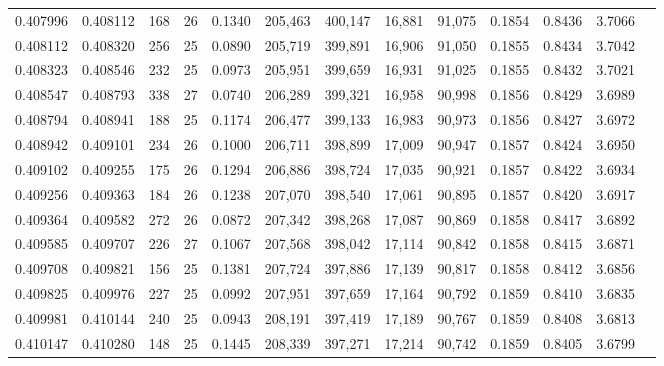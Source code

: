 \begin{tabular}{rrrrrrrrrrrrr}
0.407996 & 0.408112 & 168 &  26 &                                     0.1340 & 205,463 & 400,147 &  16,881 &  91,075 & 0.1854 & 0.8436 & 3.7066 \\
0.408112 & 0.408320 & 256 &  25 &                                     0.0890 & 205,719 & 399,891 &  16,906 &  91,050 & 0.1855 & 0.8434 & 3.7042 \\
0.408323 & 0.408546 & 232 &  25 &                                     0.0973 & 205,951 & 399,659 &  16,931 &  91,025 & 0.1855 & 0.8432 & 3.7021 \\
0.408547 & 0.408793 & 338 &  27 &                                     0.0740 & 206,289 & 399,321 &  16,958 &  90,998 & 0.1856 & 0.8429 & 3.6989 \\
0.408794 & 0.408941 & 188 &  25 &                                     0.1174 & 206,477 & 399,133 &  16,983 &  90,973 & 0.1856 & 0.8427 & 3.6972 \\
0.408942 & 0.409101 & 234 &  26 &                                     0.1000 & 206,711 & 398,899 &  17,009 &  90,947 & 0.1857 & 0.8424 & 3.6950 \\
0.409102 & 0.409255 & 175 &  26 &                                     0.1294 & 206,886 & 398,724 &  17,035 &  90,921 & 0.1857 & 0.8422 & 3.6934 \\
0.409256 & 0.409363 & 184 &  26 &                                     0.1238 & 207,070 & 398,540 &  17,061 &  90,895 & 0.1857 & 0.8420 & 3.6917 \\
0.409364 & 0.409582 & 272 &  26 &                                     0.0872 & 207,342 & 398,268 &  17,087 &  90,869 & 0.1858 & 0.8417 & 3.6892 \\
0.409585 & 0.409707 & 226 &  27 &                                     0.1067 & 207,568 & 398,042 &  17,114 &  90,842 & 0.1858 & 0.8415 & 3.6871 \\
0.409708 & 0.409821 & 156 &  25 &                                     0.1381 & 207,724 & 397,886 &  17,139 &  90,817 & 0.1858 & 0.8412 & 3.6856 \\
0.409825 & 0.409976 & 227 &  25 &                                     0.0992 & 207,951 & 397,659 &  17,164 &  90,792 & 0.1859 & 0.8410 & 3.6835 \\
0.409981 & 0.410144 & 240 &  25 &                                     0.0943 & 208,191 & 397,419 &  17,189 &  90,767 & 0.1859 & 0.8408 & 3.6813 \\
0.410147 & 0.410280 & 148 &  25 &                                     0.1445 & 208,339 & 397,271 &  17,214 &  90,742 & 0.1859 & 0.8405 & 3.6799 \\

\end{tabular}
